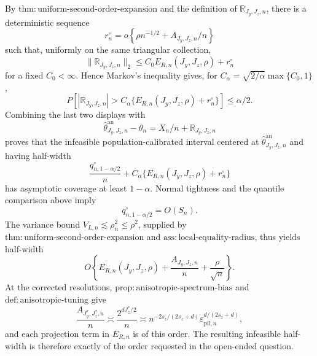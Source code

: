 By \(\mathrm{thm{:}uniform\text{-}second\text{-}order\text{-}expansion}\) and the definition of \(\mathbb R_{J_y,J_z,n}\), there is a deterministic sequence
\[
r_n^\circ=o\!\left\{\rho n^{-1/2}+A_{J_y,J_z,n}/n\right\}
\]
such that, uniformly on the same triangular collection,
\[
\|\mathbb R_{J_y,J_z,n}\|_2\le C_0E_{R,n}(J_y,J_z,\rho)+r_n^\circ
\]
for a fixed \(C_0<\infty\).  Hence Markov's inequality gives, for
\(C_\alpha=\sqrt{2/\alpha}\max\{C_0,1\}\),
\[
P\!\left[
|\mathbb R_{J_y,J_z,n}|>
C_\alpha\{E_{R,n}(J_y,J_z,\rho)+r_n^\circ\}
\right]\le\alpha/2.
\]
Combining the last two displays with
\[
\widehat\theta^{\mathrm{an}}_{J_y,J_z,n}-\theta_n
=X_n/n+\mathbb R_{J_y,J_z,n}
\]
proves that the infeasible population-calibrated interval centered at
\(\widehat\theta^{\mathrm{an}}_{J_y,J_z,n}\) and having half-width
\[
\frac{q_{n,1-\alpha/2}^\circ}{n}
+C_\alpha\{E_{R,n}(J_y,J_z,\rho)+r_n^\circ\}
\]
has asymptotic coverage at least \(1-\alpha\).  Normal tightness and the quantile comparison above imply
\[
q_{n,1-\alpha/2}^\circ=O(S_n).
\]
The variance bound \(V_{L,n}\lesssim\rho_n^2\le\rho^2\), supplied by
\(\mathrm{thm{:}uniform\text{-}second\text{-}order\text{-}expansion}\) and
\(\mathrm{ass{:}local\text{-}equality\text{-}radius}\), thus yields half-width
\[
O\!\left\{
E_{R,n}(J_y,J_z,\rho)+\frac{A_{J_y,J_z,n}}n+\frac{\rho}{\sqrt n}
\right\}.
\]
At the corrected resolutions, \(\mathrm{prop{:}anisotropic\text{-}spectrum\text{-}bias}\) and
\(\mathrm{def{:}anisotropic\text{-}tuning}\) give
\[
\frac{A_{J_y^*,J_z^*,n}}n
\asymp\frac{2^{dJ_z^*/2}}n
\asymp n^{-2s_z/(2s_z+d)}
\varepsilon_{\mathrm{pil},n}^{d/(2s_z+d)},
\]
and each projection term in \(E_{R,n}\) is of this order.  The resulting infeasible half-width is therefore exactly of the order requested in the open-ended question.

